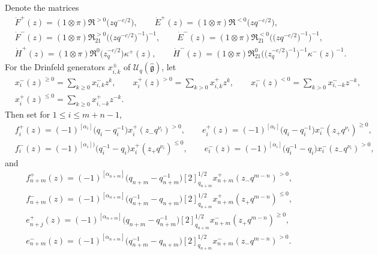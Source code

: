 \documentclass[10pt,a4paper]{amsart}
\numberwithin{equation}{section}
\begin{document}
Denote the matrices
\begin{align*}
 &\dot{F}^+(z)=(1\otimes\pi)\mathfrak{R}^{>0}\bigl(zq^{-c/2}\bigr),\qquad \dot{E}^+(z)=(1\otimes\pi)\mathfrak{R}^{<0}\bigl(zq^{-c/2}\bigr), \\
 &\dot{F}^-(z)=(1\otimes\pi)\mathfrak{R}^{>0}_{21}\bigl(\bigl(zq^{-c/2}\bigr)^{-1}\bigr)^{-1},\qquad \dot{E}^-(z)=(1\otimes\pi)\mathfrak{R}^{<0}_{21}\bigl(\bigl(zq^{-c/2}\bigr)^{-1}\bigr)^{-1}, \\
 & \dot{H}^+(z)=(1\otimes\pi)\mathfrak{R}^{0}\bigl(z_q^{-c/2}\bigr)\kappa^{+}(z),\qquad
 \dot{H}^-(z)=(1\otimes\pi)\mathfrak{R}_{21}^{0}\bigl(\bigl(z_q^{-c/2}\bigr)^{-1}\bigr)^{-1}\kappa^{-}(z)^{-1}.
\end{align*}
For the Drinfeld generators $x_{i,k}^{\pm}$ of $\mathcal{U}_q(\mathfrak{\hat{g}})$, let
\begin{align*}
 & x_i^-(z)^{\geq0} =\sum\limits_{k\geq0}x_{i,k}^{-}z^k,\qquad x_i^+(z)^{>0} =\sum\limits_{k>0}x_{i,k}^{+}z^k,\qquad x_i^-(z)^{<0} =\sum\limits_{k>0}x_{i,-k}^{-}z^{-k},\\
 & x_i^+(z)^{\leq0} =\sum\limits_{k\geq0}x_{i,-k}^{+}z^{-k}.
\end{align*}
Then set for $1\leq i\leq m+n-1$,
\begin{align*}
 & f_i^+(z)=(-1)^{[\alpha_{i}]}\bigl(q_i-q_i^{-1}\bigr)x_i^+(z_-q^{\nu_i})^{>0},\qquad e_i^+(z)=(-1)^{[\alpha_{i}]}\bigl(q_i-q_i^{-1}\bigr) x_i^-(z_+q^{\nu_i})^{\geq0},\\
 & f_i^-(z)=(-1)^{[\alpha_{i}])}\bigl(q_i^{-1}-q_i\bigr)x_i^+(z_+q^{\nu_i})^{\leq0},\qquad e_i^-(z)=(-1)^{[\alpha_{i}]}\bigl(q_i^{-1}-q_i\bigr) x_i^-(z_-q^{\nu_i})^{>0},
\end{align*}
and
\begin{align*}
 & f_{n+m}^+(z)=(-1)^{[\alpha_{n+m}]}\bigl(q_{n+m}-q_{n+m}^{-1}\bigr)[2]^{1/2}_{q_{n+m}}x_{n+m}^+(z_-q^{m-n})^{>0},\\ & f_{n+m}^-(z)=(-1)^{[\alpha_{n+m}]}\bigl(q_{n+m}^{-1}-q_{n+m}\bigr)[2]^{1/2}_{q_{n+m}}x_{n+m}^+(z_+q^{m-n})^{\leq0},\\
 &e_{n+j}^+(z)=(-1)^{[\alpha_{n+m}]}\bigl(q_{n+m}-q_{n+m}^{-1}\bigr)[2]^{1/2}_{q_{n+m}} x_{n+m}^-(z_+q^{m-n})^{\geq0},\\
 &e_{n+m}^-(z)=(-1)^{[\alpha_{n+m}]}\bigl(q_{n+m}^{-1}-q_{n+m}\bigr)[2]^{1/2}_{q_{n+m}} x_{n+m}^-(z_-q^{m-n})^{>0}.
\end{align*}
\end{document}
